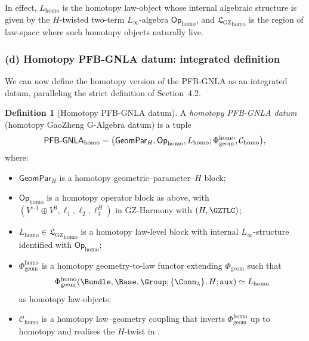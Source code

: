 \documentclass[11pt]{book}
\theoremstyle{plain}
\theoremstyle{definition}
\newtheorem{definition}[theorem]{Definition} \theoremstyle{remark}
\newcommand{\GZLS}{\ensuremath{\mathfrak{L}_{\mathrm{GZ}}}}       \newcommand{\GZLT}{\ensuremath{M_{!w}}}                           \newcommand{\GZLOC}{\ensuremath{A_M}}                             \newcommand{\GZLCurv}{\ensuremath{\mathcal{F}_{\mathrm{law}}}}
\begin{document}
In effect, $L_{\mathrm{homo}}$ is the homotopy law-object whose
internal algebraic structure is given by the $H$-twisted two-term
$L_\infty$-algebra $\mathsf{Op}_{\mathrm{homo}}$, and
${\GZLS}_{\mathrm{homo}}$ is the region of law-space where such homotopy
objects naturally live.



\subsubsection*{(d) Homotopy PFB-GNLA datum: integrated definition}

We can now define the homotopy version of the PFB-GNLA as an integrated
datum, paralleling the strict definition of Section~4.2.

\begin{definition}[Homotopy PFB-GNLA datum]
A \emph{homotopy PFB-GNLA datum} (homotopy GaoZheng G-Algebra datum)
  is a tuple
  \[
    \mathsf{PFB\text- GNLA}_{\mathrm{homo}}
    =
    \bigl(
      \mathsf{GeomPar}_H,
      \mathsf{Op}_{\mathrm{homo}},
      L_{\mathrm{homo}};
      \Phi_{\mathrm{geom}}^{\mathrm{homo}},
      \mathcal{C}_{\mathrm{homo}}
    \bigr),
  \]
  where:
  \begin{itemize}
    \item $\mathsf{GeomPar}_H$ is a homotopy geometric–parameter–$H$
          block;
    \item $\mathsf{Op}_{\mathrm{homo}}$ is a homotopy operator block
          as above, with $(V^{-1}\oplus V^0,\ell_1,\ell_2,\ell_3^H)$
          in GZ-Harmony with $(H,\GZTLC)$;
    \item $L_{\mathrm{homo}}\in{\GZLS}_{\mathrm{homo}}$ is a homotopy
          law-level block with internal $L_\infty$-structure
          identified with $\mathsf{Op}_{\mathrm{homo}}$;
    \item $\Phi_{\mathrm{geom}}^{\mathrm{homo}}$ is a homotopy
          geometry-to-law functor extending $\Phi_{\mathrm{geom}}$
          such that
          \[
            \Phi_{\mathrm{geom}}^{\mathrm{homo}}
              (\Bundle,\Base,\Group;
               \{\Conn_\lambda\},H;\text{aux})
            \simeq
            L_{\mathrm{homo}}
          \]
          as homotopy law-objects;
    \item $\mathcal{C}_{\mathrm{homo}}$ is a homotopy law–geometry
          coupling that inverts $\Phi_{\mathrm{geom}}^{\mathrm{homo}}$
          up to homotopy and realises the $H$-twist in \GZTLC.
  \end{itemize}
\end{definition}
\end{document}

